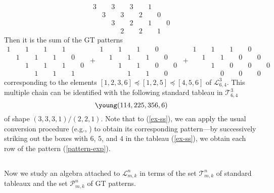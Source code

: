 \documentclass[11pt]{amsart}
\numberwithin{equation}{subsection}
\begin{document}
\begin{equation}\label{pattern-exp}
\begin{array}{ccccccccc}
3 &  & 3 &  & 3 &  & 1 &  &  \\ 
& 3 &  & 3 &  & 2 &  & 0 &  \\ 
&  & 3 &  & 2 &  & 1 &  & 0\\ 
&  &  & 2 &  & 2 &  & 1& 
\end{array}\end{equation}
Then it is the sum of the GT patterns 
\begin{equation*}
\begin{array}{ccccccccc}
1 &  & 1 &  & 1 &  & 1 &  &  \\ 
& 1 &  & 1 &  & 1 &  & 0 &  \\ 
&  & 1 &  & 1 &  & 1 &  & 0\\ 
&  &  & 1 &  & 1 &  & 1& 
\end{array}
\ +
\begin{array}{ccccccccc}
1 &  & 1 &  & 1 &  & 0 &  &  \\ 
& 1 &  & 1 &  & 1 &  & 0 &  \\ 
&  & 1 &  & 1 &  & 0 &  & 0\\ 
&  &  & 1 &  & 1 &  & 0& 
\end{array}
\ +\begin{array}{ccccccccc}
1 &  & 1 &  & 1 &  & 0 &  &  \\ 
& 1 &  & 1 &  & 0 &  & 0 &  \\ 
&  & 1 &  & 0 &  & 0 &  & 0\\ 
&  &  & 0 &  & 0 &  & 0& 
\end{array}
\end{equation*}
corresponding to the elements $[1,2,3,6] \preceq [1,2,5] \preceq [4,5,6]$ of 
$\mathcal{L}_{6,4}^3$. This multiple chain can be identified with the following
standard tableau in $\mathcal{T}_{6,4}^3$
\begin{equation}\label{ex-ss}
\young(114,225,356,6)
\end{equation}
of shape $(3,3,3,1)/(2,2,1)$. Note that to (\ref{ex-ss}), we can apply the 
usual conversion procedure (e.g., \cite[\S 8.1.2]{GW09}) to obtain 
its corresponding pattern---by successively striking out the boxes with 
$6$, $5$, and $4$ in the tableau (\ref{ex-ss}), we obtain each row of the 
pattern (\ref{pattern-exp}).

\subsection{}\label{Hibi_mkn}
Now we study an algebra attached to $\mathcal{L}_{m,k}^{n}$ in terms of the set 
$\mathcal{T}_{m,k}^n$ of standard tableaux and the set $\mathcal{P}_{m,k}^n$ of 
GT patterns.
\end{document}

